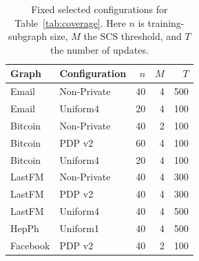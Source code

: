 \begin{table}[htbp]
\centering\small
\caption{Fixed selected configurations for Table~\ref{tab:coverage}. Here $n$ is training-subgraph size, $M$ the SCS threshold, and $T$ the number of updates.}\label{tab:frozenparams}
\begin{tabular}{llrrr}
\toprule
Graph & Configuration & $n$ & $M$ & $T$\\ \midrule
Email & Non-Private & 40 & 4 & 500 \\
Email & Uniform4 & 20 & 4 & 100 \\
Bitcoin & Non-Private & 40 & 2 & 100 \\
Bitcoin & PDP v2 & 60 & 4 & 100 \\
Bitcoin & Uniform4 & 20 & 4 & 100 \\
LastFM & Non-Private & 40 & 4 & 300 \\
LastFM & PDP v2 & 40 & 4 & 300 \\
LastFM & Uniform4 & 40 & 4 & 500 \\
HepPh & Uniform1 & 40 & 4 & 500 \\
Facebook & PDP v2 & 40 & 2 & 100 \\
\bottomrule\end{tabular}
\end{table}
